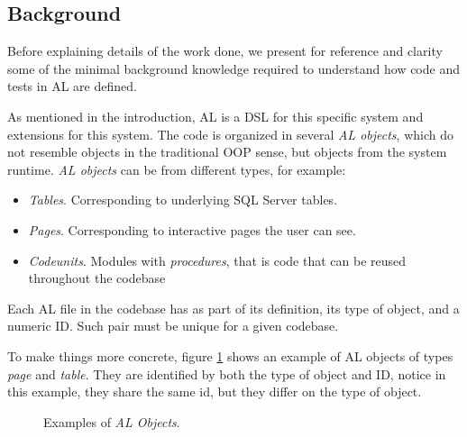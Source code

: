 \documentclass{article}
\begin{document}
\subsection{Background}\label{section:al-background-info}
Before explaining details of the work done, we present for reference and clarity some of the minimal background knowledge required to understand how code and tests in AL are defined.

As mentioned in the introduction, AL is a DSL for this specific system and extensions for this system. The code is organized in several \emph{AL objects}, which do not resemble objects in the traditional OOP sense, but objects from the system runtime. \emph{AL objects} can be from different types, for example:
\begin{itemize}
\item \emph{Tables}. Corresponding to underlying SQL Server tables.
\item \emph{Pages}. Corresponding to interactive pages the user can see.
\item \emph{Codeunits}. Modules with \emph{procedures}, that is code that can be reused throughout the codebase
\end{itemize}

Each AL file in the codebase has as part of its definition, its type of object, and a numeric ID. Such pair must be unique for a given codebase.

To make things more concrete, figure \ref{fig:al-examples} shows an example of AL objects of types \emph{page} and \emph{table}. They are identified by both the type of object and ID, notice in this example, they share the same id, but they differ on the type of object.
\begin{figure}[H]
  \centering
  \qquad
  \caption{Examples of \emph{AL Objects}. }
  \label{fig:al-examples}
\end{figure}
\end{document}
